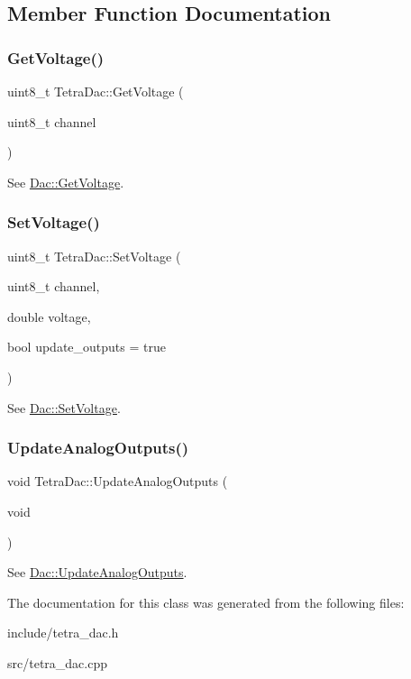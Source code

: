 \subsection{Member Function Documentation}
\mbox{\label{classTetraDac_a6a5206bc2e525ea820a1b3279526850c}} 
\subsubsection{\texorpdfstring{Get\+Voltage()}{GetVoltage()}}
{\footnotesize\ttfamily uint8\+\_\+t Tetra\+Dac\+::\+Get\+Voltage (\begin{DoxyParamCaption}\item[{uint8\+\_\+t}]{channel }\end{DoxyParamCaption})}

See \mbox{\hyperlink{classDac_ad51bf5450f03f39a0357398af69f1705}{Dac\+::\+Get\+Voltage}}. \mbox{\label{classTetraDac_a265bed4317bb6b3b4c6962fa538631da}} 
\subsubsection{\texorpdfstring{Set\+Voltage()}{SetVoltage()}}
{\footnotesize\ttfamily uint8\+\_\+t Tetra\+Dac\+::\+Set\+Voltage (\begin{DoxyParamCaption}\item[{uint8\+\_\+t}]{channel,  }\item[{double}]{voltage,  }\item[{bool}]{update\+\_\+outputs = {\ttfamily true} }\end{DoxyParamCaption})}

See \mbox{\hyperlink{classDac_ab2f0e36184b9b529de04136c36a3a51b}{Dac\+::\+Set\+Voltage}}. \mbox{\label{classTetraDac_ae7e2c1afbc64a8cc0ddd2ef4af0b25b3}} 
\subsubsection{\texorpdfstring{Update\+Analog\+Outputs()}{UpdateAnalogOutputs()}}
{\footnotesize\ttfamily void Tetra\+Dac\+::\+Update\+Analog\+Outputs (\begin{DoxyParamCaption}\item[{void}]{ }\end{DoxyParamCaption})}

See \mbox{\hyperlink{classDac_aafef1707ec33a2166a69e9b646cd471b}{Dac\+::\+Update\+Analog\+Outputs}}. 

The documentation for this class was generated from the following files\+:\begin{DoxyCompactItemize}
\item 
include/tetra\+\_\+dac.\+h\item 
src/tetra\+\_\+dac.\+cpp\end{DoxyCompactItemize}
